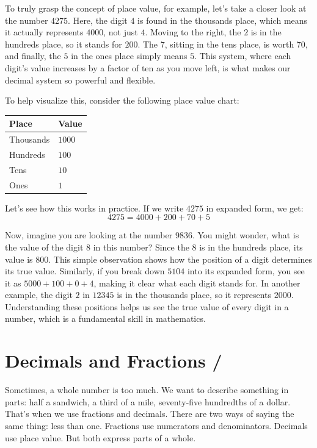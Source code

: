 To truly grasp the concept of place value, for example, let's take a closer look at the number
\(4275\). Here, the digit \(4\) is found in the thousands place, which means it
actually represents \(4000\), not just \(4\). Moving to the right, the \(2\) is in
the hundreds place, so it stands for \(200\). The \(7\), sitting in the tens
place, is worth \(70\), and finally, the \(5\) in the ones place simply means
\(5\). This system, where each digit's value increases by a factor of ten as you
move left, is what makes our decimal system so powerful and flexible.

To help visualize this, consider the following place value chart:

\begin{center}
  \begin{tabular}{ l l }
    \hline
    Place & Value \\
    \hline
    Thousands & \(1000\) \\
    Hundreds  & \(100\) \\
    Tens      & \(10\) \\
    Ones      & \(1\) \\
    \hline
  \end{tabular}
\end{center}

Let's see how this works in practice. If we write \(4275\) in expanded form, we
get:
\[
4275 = 4000 + 200 + 70 + 5
\]

Now, imagine you are looking at the number \(9836\). You might wonder, what is the
value of the digit \(8\) in this number? Since the \(8\) is in the hundreds place,
its value is \(800\). This simple observation shows how the position of a digit
determines its true value. Similarly, if you break down \(5104\) into its expanded
form, you see it as \(5000 + 100 + 0 + 4\), making it clear what each digit stands
for. In another example, the digit \(2\) in \(12345\) is in the thousands place,
so it represents \(2000\). Understanding these positions helps us see the true
value of every digit in a number, which is a fundamental skill in mathematics.






\newpage
\section{Decimals and Fractions / }

Sometimes, a whole number is too much. We want to describe something in parts:
half a sandwich, a third of a mile, seventy-five hundredths of a dollar. That's
when we use fractions and decimals. There are two ways of saying the same thing:
less than one. Fractions use numerators and denominators. Decimals use place
value. But both express parts of a whole.

